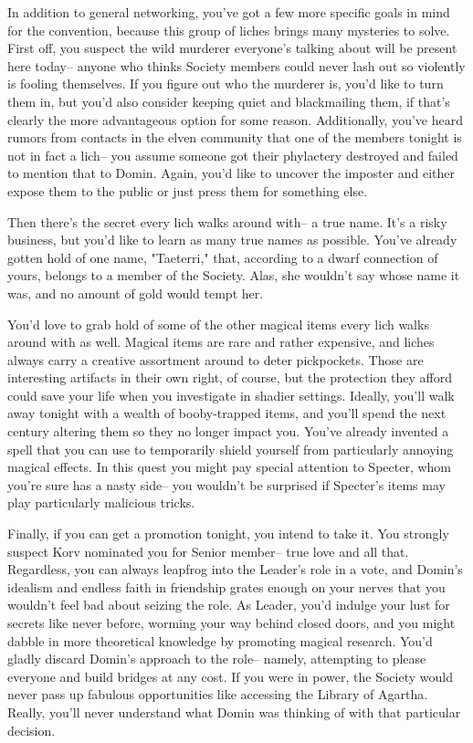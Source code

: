 \documentclass[char]{Sel}
\begin{document}
In addition to general networking, you've got a few more specific goals in mind for the convention, because this group of liches brings many mysteries to solve. First off, you suspect the wild murderer everyone's talking about will be present here today-- anyone who thinks Society members could never lash out so violently is fooling themselves. If you figure out who the murderer is, you'd like to turn them in, but you'd also consider keeping quiet and blackmailing them, if that's clearly the more advantageous option for some reason. Additionally, you've heard rumors from contacts in the elven community that one of the members tonight is not in fact a lich-- you assume someone got their phylactery destroyed and failed to mention that to Domin. Again, you'd like to uncover the imposter and either expose them to the public or just press them for something else.

Then there's the secret every lich walks around with-- a true name. It's a risky business, but you'd like to learn as many true names as possible. You've already gotten hold of one name, "Taeterri," that, according to a dwarf connection of yours, belongs to a member of the Society. Alas, she wouldn't say whose name it was, and no amount of gold would tempt her.

You'd love to grab hold of some of the other magical items every lich walks around with as well. Magical items are rare and rather expensive, and liches always carry a creative assortment around to deter pickpockets. Those are interesting artifacts in their own right, of course, but the protection they afford could save your life when you investigate in shadier settings. Ideally, you'll walk away tonight with a wealth of booby-trapped items, and you'll spend the next century altering them so they no longer impact you. You've already invented a spell that you can use to temporarily shield yourself from particularly annoying magical effects. In this quest you might pay special attention to Specter, whom you're sure has a nasty side-- you wouldn't be surprised if Specter's items may play particularly malicious tricks.

Finally, if you can get a promotion tonight, you intend to take it. You strongly suspect Korv nominated you for Senior member-- true love and all that. Regardless, you can always leapfrog into the Leader's role in a vote, and Domin's idealism and endless faith in friendship grates enough on your nerves that you wouldn't feel bad about seizing the role. As Leader, you'd indulge your lust for secrets like never before, worming your way behind closed doors, and you might dabble in more theoretical knowledge by promoting magical research. You'd gladly discard Domin's approach to the role-- namely, attempting to please everyone and build bridges at any cost. If you were in power, the Society would never pass up fabulous opportunities like accessing the Library of Agartha. Really, you'll never understand what Domin was thinking of with that particular decision.
\end{document}
